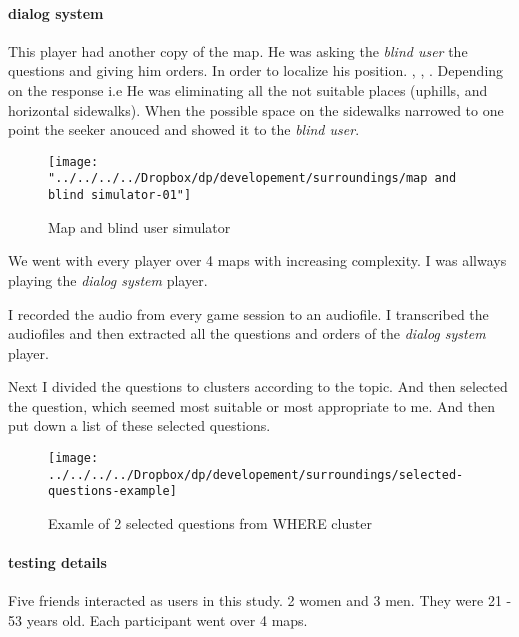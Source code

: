 				\paragraph{dialog system}
					This player had another copy of the map. He was asking the \emph{blind user} the questions and giving him orders. In order to localize his position. , , . Depending on the response i.e  He was
					eliminating all the not suitable places (uphills, and horizontal sidewalks). When the possible
					space on the sidewalks narrowed to one point the seeker anouced 
					and showed it to the \emph{blind user}.	
				
				\begin{figure}[th]
					\centering
					\texttt{[image: "../../../../Dropbox/dp/developement/surroundings/map and blind simulator-01"]}
					\caption{Map and blind user simulator}
					\label{fig:map-and-blind-simulator}
				\end{figure}
				
				We went with every player over 4 maps with increasing complexity. 
				I was allways playing the \emph{dialog system} player.
				
				I recorded the audio from every game session to an audiofile. I transcribed the audiofiles and then extracted all the questions and orders of the \emph{dialog system} player.
				
				Next I divided the questions to clusters according to the topic. And then selected the question, which seemed most suitable or most appropriate to me. And then put down a list of these selected questions.
			
				\begin{figure}[th]
					\centering
					\texttt{[image: ../../../../Dropbox/dp/developement/surroundings/selected-questions-example]}
					\caption{Examle of 2 selected questions from WHERE cluster}
					\label{fig:clusteredquestions}
				\end{figure}
			
				\paragraph{testing details}
					Five friends interacted as users in this study. 2 women and 3 men. They were 21 - 53 years old. Each participant went over 4 maps.
			
